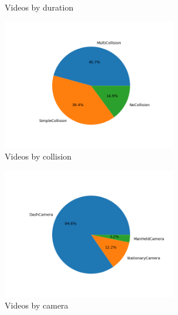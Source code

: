 \documentclass[letterpaper, 10 pt, conference]{IEEEconf}
\newcommand{\todo}[1]{{\color{red}#1}}
\begin{document}
\begin{figure}[htpb]
		\centering
		\caption{Videos by duration}
		\label{fig:vids-by-duration}
\end{figure}

\begin{figure}[htpb]
		\centering
    \includegraphics[width=3in]{by-collision.png}
		\caption{Videos by collision}
		\label{fig:vids-by-collision}
\end{figure}

\begin{figure}[htpb]
		\centering
    \includegraphics[width=3in]{by-camera.png}
		\caption{Videos by camera}
		\label{fig:vids-by-camera}
\end{figure}


\end{document}
